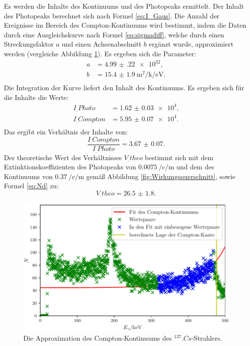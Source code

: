 \newpage
\noindent Es werden die Inhalte des Kontinuums und des Photopeaks ermittelt. Der Inhalt des Photopeaks berechnet sich nach Formel \eqref{eq:I_Gaus}. Die Anzahl der Ereignisse im Bereich des Compton-Kontinuums wird bestimmt, indem die Daten durch eine Ausgleichskurve nach Formel \eqref{eq:sigmadiff}, welche durch einen Streckungsfaktor $a$ und einen Achsenabschnitt $b$ ergänzt wurde, approximiert werden (vergleiche Abbildung \ref{fig:Comptonkontinuum}). Es ergeben sich die Parameter:
\begin{align*}
a	&= \num{4.99(22)e32}{}\text{,}\\
b	&= \SI{15.4(19)}{\metre\squared\per\kilo\per\electronvolt}\text{.}\\
\end{align*}
Die Integration der Kurve liefert den Inhalt des Kontinuums.
Es ergeben sich für die Inhalte die Werte:
\begin{align*}
I_.{Photo} 	 &= \num{1.62(3)e4}\text{,}\\
I_.{Compton} &= \num{5.95(7)e4}\text{.}\\
\end{align*} 
Das ergibt ein Verhältnis der Inhalte von:
\[
\frac{I_.{Compton}}{I_.{Photo}} = \num{3.67(7)}\text{.}
\]
Der theoretische Wert des Verhältnisses $V_.{theo}$ bestimmt sich mit dem Extinktionskoeffizienten des Photopeaks von $\SI{0.0075}{\per\centi\per\metre}$ und dem des Kontinuums von $\SI{0.37}{\per\centi\per\metre}$ gemäß Abbildung \ref{fig:Wirkungsquerschnitt}, sowie Formel \eqref{eq:Nd} zu: 
\[
V_.{theo} = \num{26.5(18)}\text{.}
\]

\begin{figure}
	\centering
	\includegraphics[width=\linewidth-60pt,height=\textheight-60pt,keepaspectratio]{content/images/Cs137Kon.pdf}
	\caption{Die Approximation des Compton-Kontinuums des $^{137}.{Cs}$-Strahlers.}
	\label{fig:Comptonkontinuum}
\end{figure}

